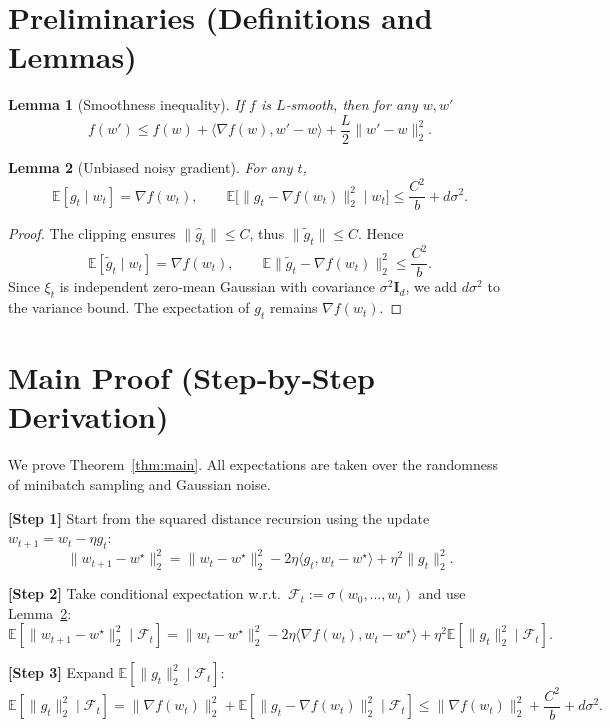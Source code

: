 \documentclass{article}
\newtheorem{lemma}{Lemma}
\newcommand{\E}{\mathbb{E}}
\begin{document}
\section*{Preliminaries (Definitions and Lemmas)}
\begin{lemma}[Smoothness inequality]\label{lem:smooth}
If $f$ is $L$‑smooth, then for any $w,w'$
\[
f(w')\le f(w)+\langle\nabla f(w),w'-w\rangle+\frac{L}{2}\|w'-w\|_2^2 .
\]
\end{lemma}
\begin{lemma}[Unbiased noisy gradient]\label{lem:unbiased}
For any $t$,
\[
\E[g_t\mid w_t]=\nabla f(w_t),
\qquad
\E\big[\|g_t-\nabla f(w_t)\|_2^2\mid w_t\big]
\le \frac{C^2}{b}+d\sigma^2 .
\]
\end{lemma}
\begin{proof}
The clipping ensures $\|\hat g_i\|\le C$, thus $\|\tilde g_t\|\le C$. Hence
\[
\E[\tilde g_t\mid w_t]=\nabla f(w_t),\qquad
\E\|\tilde g_t-\nabla f(w_t)\|_2^2\le\frac{C^2}{b}.
\]
Since $\xi_t$ is independent zero‑mean Gaussian with covariance $\sigma^2\mathbf I_d$, we add $d\sigma^2$ to the variance bound. The expectation of $g_t$ remains $\nabla f(w_t)$. \qedhere
\end{proof}

\section*{Main Proof (Step‑by‑Step Derivation)}
We prove Theorem~\ref{thm:main}.  
All expectations are taken over the randomness of minibatch sampling and Gaussian noise.

\bigskip
\noindent\textbf{[Step 1]}  Start from the squared distance recursion using the update $w_{t+1}=w_t-\eta g_t$:
\[
\|w_{t+1}-w^\star\|_2^2
= \|w_t-w^\star\|_2^2-2\eta\langle g_t,w_t-w^\star\rangle+\eta^2\|g_t\|_2^2 .
\tag{1}
\]

\noindent\textbf{[Step 2]}  Take conditional expectation w.r.t.\ $\mathcal{F}_t:=\sigma(w_0,\dots,w_t)$ and use Lemma~\ref{lem:unbiased}:
\[
\E\!\left[\|w_{t+1}-w^\star\|_2^2\mid\mathcal{F}_t\right]
= \|w_t-w^\star\|_2^2-2\eta\langle \nabla f(w_t),w_t-w^\star\rangle
+\eta^2\E\!\left[\|g_t\|_2^2\mid\mathcal{F}_t\right].
\tag{2}
\]

\noindent\textbf{[Step 3]}  Expand $\E[\|g_t\|_2^2\mid\mathcal{F}_t]$:
\[
\E[\|g_t\|_2^2\mid\mathcal{F}_t]
= \|\nabla f(w_t)\|_2^2
+ \E\!\left[\|g_t-\nabla f(w_t)\|_2^2\mid\mathcal{F}_t\right]
\le \|\nabla f(w_t)\|_2^2+\frac{C^2}{b}+d\sigma^2 .
\tag{3}
\]
\end{document}
